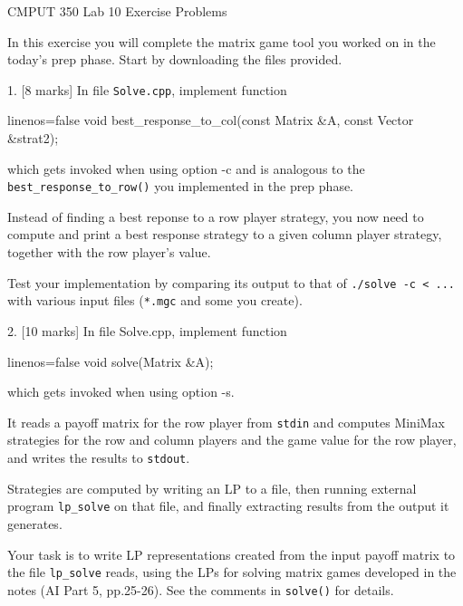 \documentclass[a4paper,11pt]{article}
\begin{document}

\begin{center}
{\Large CMPUT 350 Lab 10 Exercise Problems}
\end{center}



In this exercise you will complete the matrix game tool you worked on in the
today's prep phase.
Start by downloading the files provided.

\linerule 

1. [8 marks]
In file \texttt{Solve.cpp}, implement function
\begin{cppcode*}{linenos=false}
void best_response_to_col(const Matrix &A, const Vector &strat2);
\end{cppcode*}
which gets invoked when using option -c and is analogous to the
\texttt{best\_response\_to\_row()} you implemented in the prep phase.

\medskip

Instead of finding a best reponse to a row player strategy, you now need to
compute and print a best response strategy to a given column player strategy,
together with the row player's value.

\medskip

Test your implementation by comparing its output to that of \texttt{./solve -c < ...}
with various input files (\texttt{*.mgc} and some you create).

\linerule 

\newpage 

2. [10 marks]
In file Solve.cpp, implement function
\begin{cppcode*}{linenos=false}
void solve(Matrix &A);
\end{cppcode*}
which gets invoked when using option -s.

It reads a payoff matrix for the row player from \texttt{stdin} and computes MiniMax
strategies for the row and column players and the game value for the row
player, and writes the results to \texttt{stdout}.

\medskip

Strategies are computed by writing an LP to a file, then running external
program \texttt{lp\_solve} on that file, and finally extracting results from the output
it generates.

\medskip

Your task is to write LP representations created from the input payoff matrix
to the file \texttt{lp\_solve} reads, using the LPs for solving matrix games developed
in the notes (AI Part 5, pp.25-26).
See the comments in \texttt{solve()} for details.
\end{document}
